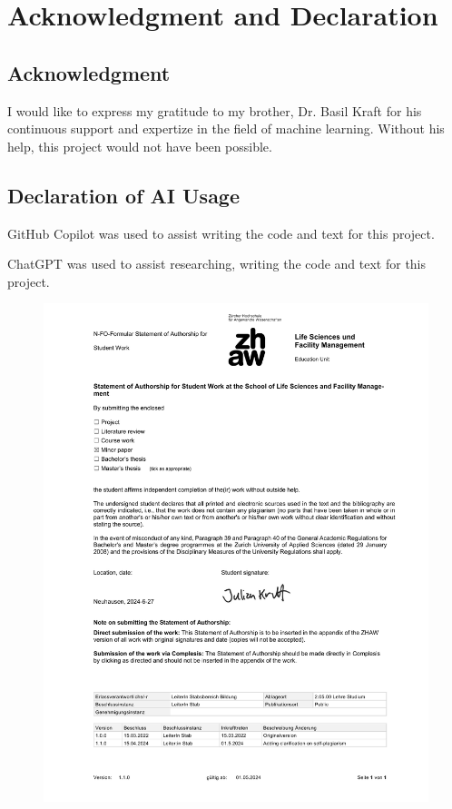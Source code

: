 


\section{Acknowledgment and Declaration}
\label{acknowledgment_declaration}

\subsection{Acknowledgment}

I would like to express my gratitude to my brother, Dr. Basil Kraft for his continuous
support and expertize in the field of machine learning. Without his help, this project would not 
have been possible.

\subsection{Declaration of AI Usage}

GitHub Copilot was used to assist writing the code and text for this project.

ChatGPT was used to assist researching, writing the code and text for this project.

\newpage
{}


\thispagestyle{empty}
\begin{figure}[h!]
    \centering
    \includegraphics[width=1\textwidth]{figures/denlaration_independence.pdf}
\end{figure}
\restoregeometry %
